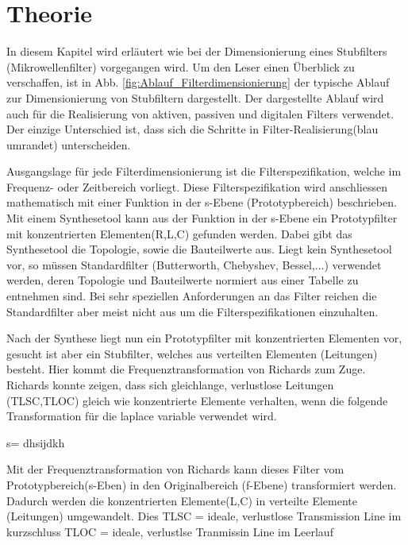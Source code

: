 \section{Theorie}

In diesem Kapitel wird erläutert wie bei der Dimensionierung eines Stubfilters (Mikrowellenfilter) vorgegangen wird. Um den Leser einen Überblick zu verschaffen, ist in Abb. \ref{fig:Ablauf_Filterdimensionierung} der typische Ablauf zur Dimensionierung von Stubfiltern dargestellt. Der dargestellte Ablauf wird auch für die Realisierung von aktiven, passiven und digitalen Filters verwendet. Der einzige Unterschied ist, dass sich die Schritte in Filter-Realisierung(blau umrandet) unterscheiden.

Ausgangslage für jede Filterdimensionierung ist die Filterspezifikation, welche im Frequenz- oder Zeitbereich vorliegt. Diese Filterspezifikation wird anschliessen mathematisch mit einer Funktion in der s-Ebene (Prototypbereich) beschrieben. Mit einem Synthesetool kann aus der Funktion in der s-Ebene ein Prototypfilter mit konzentrierten Elementen(R,L,C) gefunden werden. Dabei gibt das Synthesetool die Topologie, sowie die Bauteilwerte aus. Liegt kein Synthesetool vor, so müssen Standardfilter (Butterworth, Chebyshev, Bessel,...) verwendet werden, deren Topologie und Bauteilwerte normiert aus einer Tabelle zu entnehmen sind. Bei sehr speziellen Anforderungen an das Filter reichen die Standardfilter aber meist nicht aus um die Filterspezifikationen einzuhalten.

Nach der Synthese liegt nun ein Prototypfilter mit konzentrierten Elementen vor, gesucht ist aber ein Stubfilter, welches aus verteilten Elementen (Leitungen) besteht. Hier kommt die Frequenztransformation von Richards zum Zuge. Richards konnte zeigen, dass sich gleichlange, verlustlose Leitungen (TLSC,TLOC) gleich wie konzentrierte Elemente verhalten, wenn die folgende Transformation für die laplace variable verwendet wird.

s= dhsijdkh

Mit der Frequenztransformation von Richards kann dieses Filter vom Prototypbereich(s-Eben) in den Originalbereich (f-Ebene) transformiert werden. Dadurch werden die konzentrierten Elemente(L,C) in verteilte Elemente (Leitungen) umgewandelt. Dies 
TLSC = ideale, verlustlose Transmission Line im kurzschluss
TLOC = ideale, verlustlse Tranmissin Line im Leerlauf



\newpage

